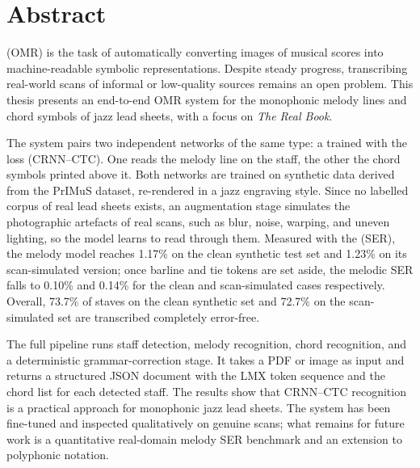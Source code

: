 \chapter*{Abstract}

 (OMR) is the task of automatically converting images
of musical scores into machine-readable symbolic representations. Despite steady
progress, transcribing real-world scans of informal or low-quality sources remains an
open problem. This thesis presents an end-to-end OMR system for the monophonic melody
lines and chord symbols of jazz lead sheets, with a focus on \textit{The Real Book}.

The system pairs two independent networks of the same type: a  trained with the 
loss (CRNN--CTC). One reads the melody line on the staff, the other the chord symbols
printed above it. Both networks are trained on synthetic data derived from the PrIMuS dataset,
re-rendered in a jazz engraving style. Since no labelled corpus of real lead sheets
exists, an augmentation stage simulates the photographic artefacts of real scans, such
as blur, noise, warping, and uneven lighting, so the model learns to read through them.
Measured with the  (SER), the melody model reaches 1.17\% on the
clean synthetic test set and 1.23\% on its scan-simulated version; once barline and tie
tokens are set aside, the melodic SER falls to 0.10\% and 0.14\% for the clean and
scan-simulated cases respectively. Overall, 73.7\% of staves on the clean
synthetic set and 72.7\% on the scan-simulated set are transcribed completely error-free.

The full pipeline runs staff detection, melody recognition, chord recognition, and a
deterministic grammar-correction stage. It takes a PDF or image as input and returns a
structured JSON document with the LMX token sequence and the chord list for each detected
staff. The results show that CRNN--CTC recognition is a practical approach for monophonic
jazz lead sheets. The system has been fine-tuned and inspected qualitatively on genuine scans;
what remains for future work is a quantitative real-domain melody SER benchmark and an
extension to polyphonic notation.
